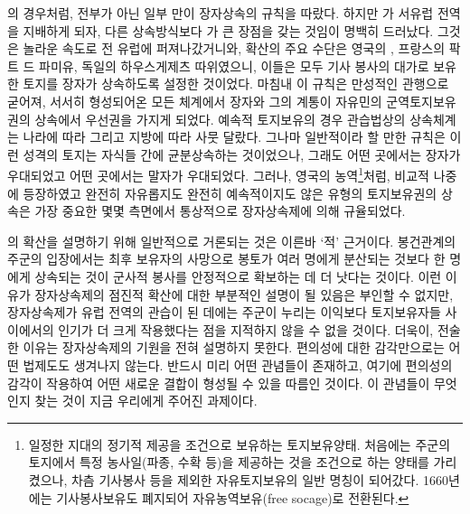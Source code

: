의 경우처럼,
전부가 아닌 일부 만이 장자상속의 규칙을 따랐다.
하지만 가 서유럽 전역을 지배하게 되자,
다른 상속방식보다 가 큰 장점을 갖는 것임이 명백히 드러났다.
그것은 놀라운 속도로 전 유럽에 퍼져나갔거니와,
확산의 주요 수단은 영국의 ,
프랑스의 팍트 드 파미유,
독일의 하우스게제츠 따위였으니,
이들은 모두 기사 봉사의 대가로 보유한 토지를
장자가 상속하도록 설정한 것이었다.
마침내 이 규칙은 만성적인 관행으로 굳어져,
서서히 형성되어온 모든  체계에서
장자와 그의 계통이
자유민의
군역토지보유권의 상속에서 우선권을 가지게 되었다.
예속적 토지보유의 경우 
관습법상의 상속체계는 나라에 따라 그리고 지방에 따라 사뭇 달랐다.
그나마 일반적이라 할 만한 규칙은 이런 성격의 토지는 자식들 간에
균분상속하는 것이었으나, 그래도 어떤 곳에서는
장자가 우대되었고 어떤 곳에서는 말자가 우대되었다.
그러나,
영국의 농역\footnote{%
  일정한 지대의 정기적 제공을 조건으로 보유하는 토지보유양태.
  처음에는 주군의 토지에서 특정 농사일(파종, 수확 등)을 제공하는 것을
  조건으로 하는 양태를 가리켰으나, 차츰
  기사봉사 등을 제외한 자유토지보유의 일반 명칭이 되어갔다.
  1660년에는 기사봉사보유도 폐지되어 자유농역보유(free socage)로 전환된다.
}처럼,
비교적 나중에 등장하였고 완전히 자유롭지도 완전히 예속적이지도 않은
유형의 토지보유권의 상속은 가장 중요한 몇몇 측면에서
통상적으로 장자상속제에 의해 규율되었다.

의 확산을 설명하기 위해 일반적으로 거론되는 것은
이른바 `적' 근거이다.
봉건관계의 주군의 입장에서는
최후 보유자의 사망으로
봉토가
여러 명에게 분산되는 것보다
한 명에게 상속되는 것이 군사적 봉사를 안정적으로 확보하는 데
더 낫다는 것이다.
이런 이유가 장자상속제의 점진적 확산에 대한 부분적인 설명이 될 있음은
부인할 수 없지만,
장자상속제가 유럽 전역의 관습이 된 데에는
주군이 누리는 이익보다 토지보유자들 사이에서의 인기가 더 크게
작용했다는 점을
지적하지 않을 수 없을 것이다.
더욱이, 전술한 이유는 장자상속제의 기원을 전혀 설명하지 못한다.
편의성에 대한 감각만으로는 어떤 법제도도 생겨나지 않는다.
반드시 미리 어떤 관념들이 존재하고, 여기에 편의성의 감각이 작용하여
어떤 새로운 결합이 형성될 수 있을 따름인 것이다.
이 관념들이 무엇인지 찾는 것이 지금 우리에게 주어진 과제이다.

